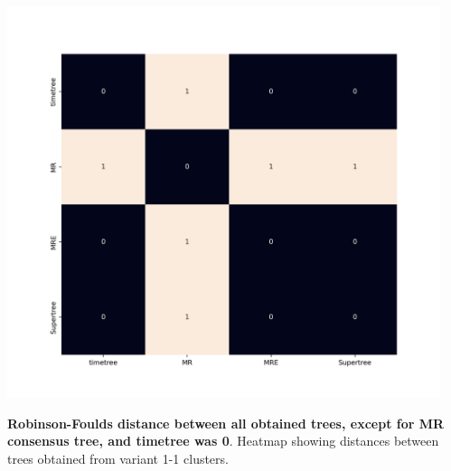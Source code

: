 \documentclass[two column, twoside, a4paper]{article}
\begin{document}
\begin{suppfigure*}
  \begin{center}
    \includegraphics[width=0.95\textwidth]{figures/distances_heatmap.png}
  \end{center}
  \caption{\sf \textbf{Robinson-Foulds distance between all obtained trees, except for MR consensus tree, and timetree was 0}. Heatmap showing distances between trees obtained from variant 1-1 clusters.} 
  \label{fig:rf}
\end{suppfigure*}
\end{document}

